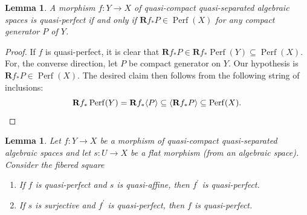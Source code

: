 \documentclass[11pt]{amsart}
\let\oldequation\equation
\let\oldendequation\endequation
\renewenvironment{equation}{\linenomathNonumbers\oldequation}{\oldendequation\endlinenomath}
\theoremstyle{plain}
\newtheorem{lemma}[theorem]{Lemma}
\theoremstyle{definition}
\numberwithin{equation}{section}
\numberwithin{theorem}{section}
\begin{document}
\begin{lemma}
    \label{lem:perfect_morphism_via_generation}
    A morphism $f\colon Y \to X$ of quasi-compact quasi-separated algebraic spaces is quasi-perfect if and only if $\mathbf{R}f_\ast P\in \operatorname{Perf}(X)$ for any compact generator $P$ of $Y$.
\end{lemma}

\begin{proof}
    If $f$ is quasi-perfect, it is clear that $\mathbf{R}f_\ast P\in \mathbf{R}f_\ast \operatorname{Perf}(Y)\subseteq \operatorname{Perf}(X)$.
    For, the converse direction, let $P$ be compact generator on $Y$. Our hypothesis is $\mathbf{R}f_\ast P\in \operatorname{Perf}(X)$. 
    The desired claim then follows from the following string of inclusions:
    \begin{displaymath}
        \mathbf{R}f_\ast \operatorname{Perf}(Y) = \mathbf{R}f_\ast \langle P \rangle \subseteq \langle \mathbf{R}f_\ast P \rangle \subseteq \operatorname{Perf}(X).\qedhere
    \end{displaymath}
\end{proof}

\begin{lemma}
    \label{lem:faithfully_flat_detect_perfect}
    Let $f\colon Y\to X$ be a morphism of quasi-compact quasi-separated algebraic spaces and let $s\colon U \to X$ be a flat morphism (from an algebraic space). Consider the fibered square
    \begin{equation}\label{dia:base_change_square}
    \end{equation}    \begin{enumerate}
        \item If $f$ is quasi-perfect and $s$ is quasi-affine, then  $f^\prime$ is quasi-perfect. 
        \item If $s$ is surjective and $f^\prime$ is quasi-perfect, then $f$ is quasi-perfect.
    \end{enumerate}
\end{lemma}
\end{document}
